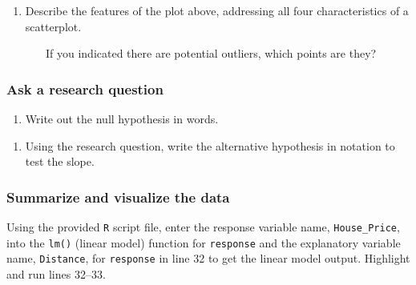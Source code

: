 \documentclass[
]{report}
\providecommand{\tightlist}{%
  \setlength{\itemsep}{0pt}\setlength{\parskip}{0pt}}
\begin{document}
\vspace{2in}

\begin{enumerate}
\def\labelenumi{\arabic{enumi}.}
\setcounter{enumi}{3}
\tightlist
\item
  Describe the features of the plot above, addressing all four characteristics of a scatterplot.
\end{enumerate}

\vspace{1in}

~~~~~~~If you indicated there are potential outliers, which points are they?

\vspace{0.5in}

\hypertarget{ask-a-research-question-6}{%
\subsubsection*{Ask a research question}\label{ask-a-research-question-6}}

\begin{enumerate}
\def\labelenumi{\arabic{enumi}.}
\setcounter{enumi}{4}
\tightlist
\item
  Write out the null hypothesis in words.
\end{enumerate}

\vspace{1in}

\begin{enumerate}
\def\labelenumi{\arabic{enumi}.}
\setcounter{enumi}{5}
\tightlist
\item
  Using the research question, write the alternative hypothesis in notation to test the slope.
\end{enumerate}

\vspace{0.5in}

\hypertarget{summarize-and-visualize-the-data-6}{%
\subsubsection*{Summarize and visualize the data}\label{summarize-and-visualize-the-data-6}}

Using the provided \texttt{R} script file, enter the response variable name, \texttt{House\_Price}, into the \texttt{lm()} (linear model) function for \texttt{response} and the explanatory variable name, \texttt{Distance}, for \texttt{response} in line 32 to get the linear model output. Highlight and run lines 32--33.
\end{document}
